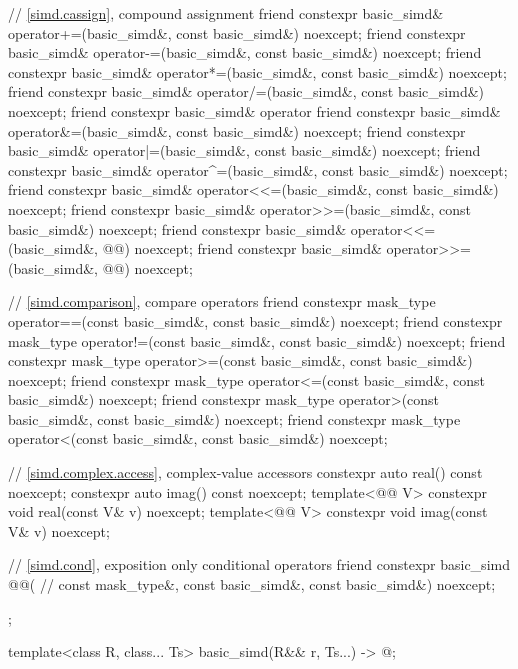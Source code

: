 \begin{codeblock}
{{    // \ref{simd.cassign},  compound assignment
    friend constexpr basic_simd& operator+=(basic_simd&, const basic_simd&) noexcept;
    friend constexpr basic_simd& operator-=(basic_simd&, const basic_simd&) noexcept;
    friend constexpr basic_simd& operator*=(basic_simd&, const basic_simd&) noexcept;
    friend constexpr basic_simd& operator/=(basic_simd&, const basic_simd&) noexcept;
    friend constexpr basic_simd& operator%
    friend constexpr basic_simd& operator&=(basic_simd&, const basic_simd&) noexcept;
    friend constexpr basic_simd& operator|=(basic_simd&, const basic_simd&) noexcept;
    friend constexpr basic_simd& operator^=(basic_simd&, const basic_simd&) noexcept;
    friend constexpr basic_simd& operator<<=(basic_simd&, const basic_simd&) noexcept;
    friend constexpr basic_simd& operator>>=(basic_simd&, const basic_simd&) noexcept;
    friend constexpr basic_simd& operator<<=(basic_simd&, @@) noexcept;
    friend constexpr basic_simd& operator>>=(basic_simd&, @@) noexcept;

    // \ref{simd.comparison},  compare operators
    friend constexpr mask_type operator==(const basic_simd&, const basic_simd&) noexcept;
    friend constexpr mask_type operator!=(const basic_simd&, const basic_simd&) noexcept;
    friend constexpr mask_type operator>=(const basic_simd&, const basic_simd&) noexcept;
    friend constexpr mask_type operator<=(const basic_simd&, const basic_simd&) noexcept;
    friend constexpr mask_type operator>(const basic_simd&, const basic_simd&) noexcept;
    friend constexpr mask_type operator<(const basic_simd&, const basic_simd&) noexcept;

    // \ref{simd.complex.access},  complex-value accessors
    constexpr auto real() const noexcept;
    constexpr auto imag() const noexcept;
    template<@@ V>
      constexpr void real(const V& v) noexcept;
    template<@@ V>
      constexpr void imag(const V& v) noexcept;

    // \ref{simd.cond},  exposition only conditional operators
    friend constexpr basic_simd @@( // \expos
      const mask_type&, const basic_simd&, const basic_simd&) noexcept;
  };

  template<class R, class... Ts>
    basic_simd(R&& r, Ts...) -> @\seebelow@;
}
\end{codeblock}

